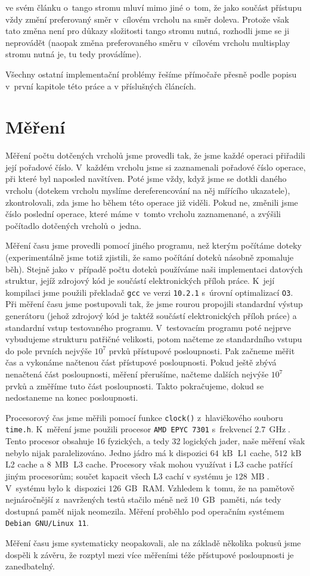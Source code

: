 \citet{tango} ve svém článku o~tango stromu mluví mimo jiné o~tom, že jako
součást přístupu vždy změní preferovaný směr v~cílovém vrcholu na směr doleva.
Protože však tato změna není pro důkazy složitosti tango stromu nutná, rozhodli
jsme se ji neprovádět (naopak změna preferovaného směru v~cílovém vrcholu
multisplay stromu nutná je, tu tedy provádíme).

Všechny ostatní implementační problémy řešíme přímočaře přesně podle popisu
v~první kapitole této práce a v příslušných článcích.

\section{Měření}

Měření počtu dotčených vrcholů jsme provedli tak, že jsme každé operaci 
přiřadili její pořadové číslo. V~každém vrcholu jsme si zaznamenali pořadové číslo
operace, při které byl naposled navštíven. Poté jsme vždy, když jsme se dotkli daného
vrcholu (dotekem vrcholu myslíme dereferencování na něj mířícího ukazatele),
zkontrolovali, zda jsme ho během této operace již viděli. Pokud ne, změnili jsme
číslo poslední operace, které máme v~tomto vrcholu zaznamenané, a zvýšili
počítadlo dotčených vrcholů o~jedna.

Měření času jsme provedli pomocí jiného programu, než kterým počítáme doteky
(experimentálně jsme totiž zjistili, že samo počítání doteků násobně zpomaluje
běh). Stejně jako v~případě počtu doteků používáme naši implementaci datových
struktur, jejíž zdrojový kód je součástí elektronických příloh práce. K~její
kompilaci jsme použili překladač {\tt gcc} ve verzi {\tt 10.2.1} s~úrovní
optimalizací {\tt O3}. Při měření času jsme postupovali tak, že jsme rourou propojili standardní výstup generátoru (jehož zdrojový kód je
taktéž součástí elektronických příloh práce) a standardní vstup testovaného
programu. V~testovacím programu poté nejprve vybudujeme
strukturu patřičné velikosti, potom načteme ze standardního vstupu do pole
prvních nejvýše $10^7$ prvků přístupové posloupnosti. Pak začneme měřit
čas a vykonáme načtenou část přístupové posloupnosti. Pokud ještě zbývá
nenačtená část posloupnosti, měření přerušíme, načteme dalších nejvýše
$10^7$ prvků a změříme tuto část posloupnosti. Takto pokračujeme, dokud
se nedostaneme na konec posloupnosti.

Procesorový čas jsme měřili pomocí funkce {\tt clock()} z~hlavičkového souboru
{\tt time.h}. K~měření jsme použili procesor {\tt AMD EPYC 7301}
s~frekvencí  $2.7\, \operatorname{GHz}$. Tento procesor obsahuje 16 fyzických, a tedy
32 logických jader, naše měření však nebylo nijak paralelizováno. Jedno jádro má k dispozici $64\,\operatorname{kB}$ L1 cache, $512\,\operatorname{kB}$ L2 cache a $8\,\operatorname{MB}$ L3 cache. Procesory však mohou využívat i L3 cache patřící jiným procesorům; součet kapacit všech L3 cachí v systému je $128\,\operatorname{MB}$. V~systému bylo
k~dispozici $126\,\operatorname{GB}$ RAM. Vzhledem k~tomu, že na pamětově
nejnáročnější z~navržených testů stačilo méně než $10\,\operatorname{GB}$
paměti, nás tedy dostupná paměť nijak neomezila. Měření proběhlo pod operačním
systémem {\tt Debian GNU/Linux 11}.

Měření času jsme systematicky neopakovali, ale na základě několika pokusů jsme dospěli k závěru, že rozptyl mezi více měřeními téže přístupové posloupnosti je zanedbatelný.
